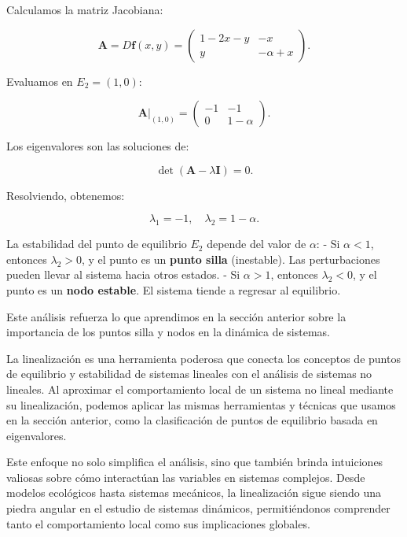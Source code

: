Calculamos la matriz Jacobiana:

\begin{equation}
    \mathbf{A} = D\mathbf{f}(x, y) =
    \begin{pmatrix}
        1 - 2x - y & -x \\
        y & -\alpha + x
    \end{pmatrix}.
\end{equation}

Evaluamos en $E_2 = (1, 0)$:

\begin{equation}
    \mathbf{A}|_{(1,0)} =
    \begin{pmatrix}
        -1 & -1 \\
        0 & 1 - \alpha
    \end{pmatrix}.
\end{equation}

Los eigenvalores son las soluciones de:

\begin{equation}
    \det(\mathbf{A} - \lambda \mathbf{I}) = 0.
\end{equation}

Resolviendo, obtenemos:

\begin{equation}
    \lambda_1 = -1, \quad \lambda_2 = 1 - \alpha.
\end{equation}

La estabilidad del punto de equilibrio $E_2$ depende del valor de $\alpha$:
- Si $\alpha < 1$, entonces $\lambda_2 > 0$, y el punto es un \textbf{punto silla} (inestable). Las perturbaciones pueden llevar al sistema hacia otros estados.
- Si $\alpha > 1$, entonces $\lambda_2 < 0$, y el punto es un \textbf{nodo estable}. El sistema tiende a regresar al equilibrio.

Este análisis refuerza lo que aprendimos en la sección anterior sobre la importancia de los puntos silla y nodos en la dinámica de sistemas.

La linealización es una herramienta poderosa que conecta los conceptos de puntos de equilibrio y estabilidad de sistemas lineales con el análisis de sistemas no lineales. Al aproximar el comportamiento local de un sistema no lineal mediante su linealización, podemos aplicar las mismas herramientas y técnicas que usamos en la sección anterior, como la clasificación de puntos de equilibrio basada en eigenvalores.

Este enfoque no solo simplifica el análisis, sino que también brinda intuiciones valiosas sobre cómo interactúan las variables en sistemas complejos. Desde modelos ecológicos hasta sistemas mecánicos, la linealización sigue siendo una piedra angular en el estudio de sistemas dinámicos, permitiéndonos comprender tanto el comportamiento local como sus implicaciones globales.

